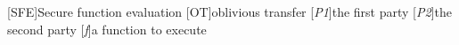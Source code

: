 \usepackage{acronym}

[SFE]{Secure function evaluation}
[OT]{oblivious transfer}
[\emph{P1}]{the first party}
[\emph{P2}]{the second party}
[\emph{f}]{a function to execute}

\newcommand{\ponein}{$i_{P1}$}
\newcommand{\ptwoin}{$i_{P2}$}

